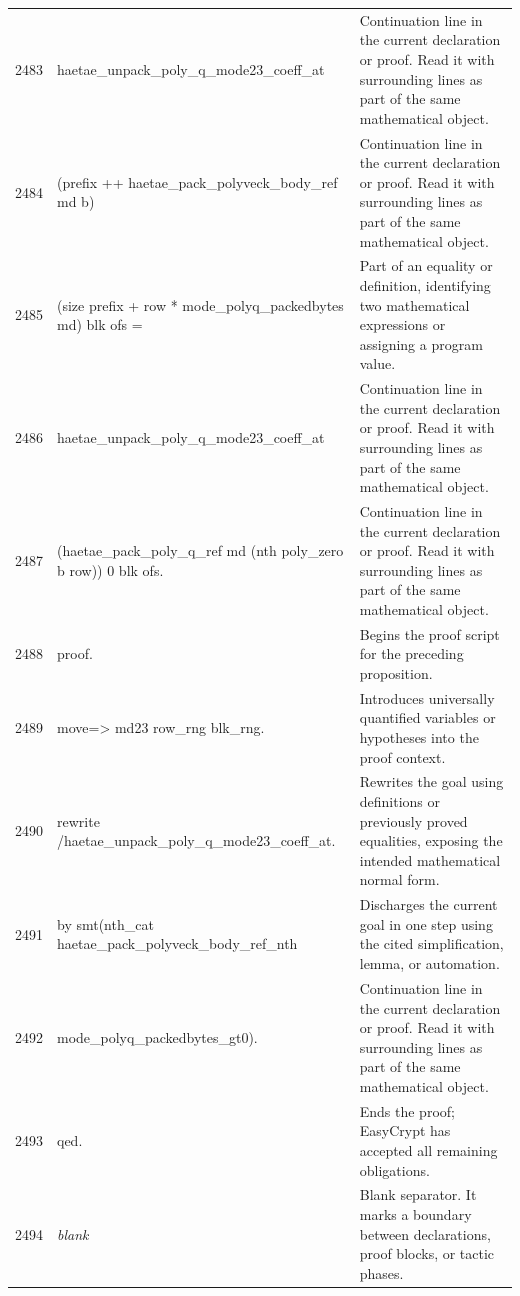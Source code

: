 \documentclass[10pt]{article}
\begin{document}
\begin{longtable}{r L{0.53\textwidth} L{0.37\textwidth}}
2483 & {\ttfamily\scriptsize   haetae\_unpack\_poly\_q\_mode23\_coeff\_at} & Continuation line in the current declaration or proof.  Read it with surrounding lines as part of the same mathematical object. \\
2484 & {\ttfamily\scriptsize     (prefix ++ haetae\_pack\_polyveck\_body\_ref md b)} & Continuation line in the current declaration or proof.  Read it with surrounding lines as part of the same mathematical object. \\
2485 & {\ttfamily\scriptsize     (size prefix + row * mode\_polyq\_packedbytes md) blk ofs =} & Part of an equality or definition, identifying two mathematical expressions or assigning a program value. \\
2486 & {\ttfamily\scriptsize   haetae\_unpack\_poly\_q\_mode23\_coeff\_at} & Continuation line in the current declaration or proof.  Read it with surrounding lines as part of the same mathematical object. \\
2487 & {\ttfamily\scriptsize     (haetae\_pack\_poly\_q\_ref md (nth poly\_zero b row)) 0 blk ofs.} & Continuation line in the current declaration or proof.  Read it with surrounding lines as part of the same mathematical object. \\
2488 & {\ttfamily\scriptsize proof.} & Begins the proof script for the preceding proposition. \\
2489 & {\ttfamily\scriptsize move=> md23 row\_rng blk\_rng.} & Introduces universally quantified variables or hypotheses into the proof context. \\
2490 & {\ttfamily\scriptsize rewrite /haetae\_unpack\_poly\_q\_mode23\_coeff\_at.} & Rewrites the goal using definitions or previously proved equalities, exposing the intended mathematical normal form. \\
2491 & {\ttfamily\scriptsize by smt(nth\_cat haetae\_pack\_polyveck\_body\_ref\_nth} & Discharges the current goal in one step using the cited simplification, lemma, or automation. \\
2492 & {\ttfamily\scriptsize        mode\_polyq\_packedbytes\_gt0).} & Continuation line in the current declaration or proof.  Read it with surrounding lines as part of the same mathematical object. \\
2493 & {\ttfamily\scriptsize qed.} & Ends the proof; EasyCrypt has accepted all remaining obligations. \\
2494 & {\ttfamily\scriptsize \emph{blank}} & Blank separator.  It marks a boundary between declarations, proof blocks, or tactic phases. \\

\end{longtable}
\end{document}
